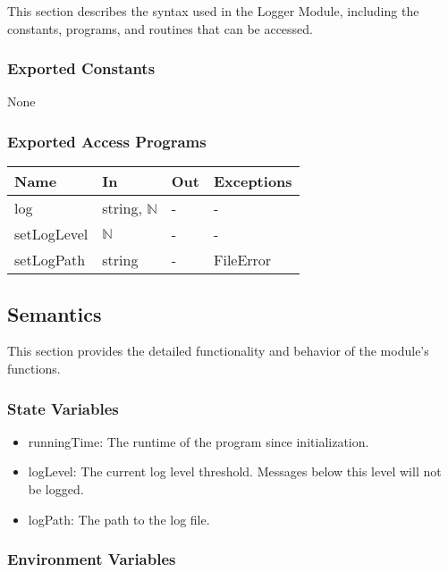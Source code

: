 \documentclass[12pt, titlepage]{article}
\begin{document}
This section describes the syntax used in the Logger Module, including the
constants, programs, and routines that can be accessed.

\subsubsection{Exported Constants}

None

\subsubsection{Exported Access Programs}

\begin{center}
\begin{tabular}{p{3cm} p{4cm} p{4cm} p{2cm}}
\hline
\textbf{Name} & \textbf{In} & \textbf{Out} & \textbf{Exceptions} \\
\hline
log & string, $\mathbb{N}$ & - & - \\
setLogLevel & $\mathbb{N}$ & - & - \\
setLogPath & string & - & FileError \\
\hline
\end{tabular}
\end{center}

\subsection{Semantics}

This section provides the detailed functionality and behavior of the module’s
functions.

\subsubsection{State Variables}

\begin{itemize}
\item runningTime: The runtime of the program since initialization.
\item logLevel: The current log level threshold. Messages below this level will
not be logged.
\item logPath: The path to the log file.
\end{itemize}

\subsubsection{Environment Variables}
\end{document}
